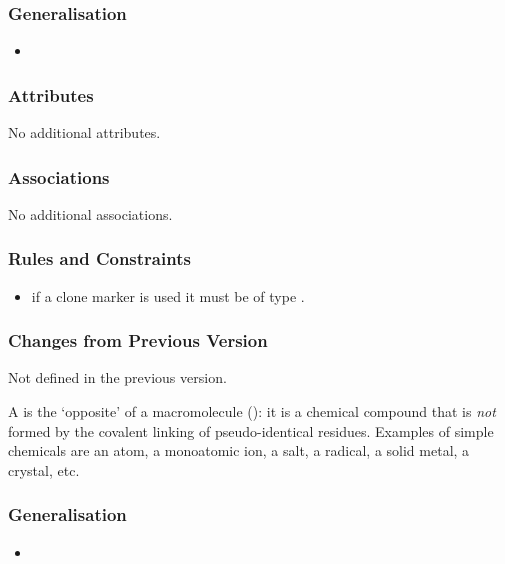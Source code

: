 \subsubsection{Generalisation}

\begin{itemize}
\item {}
\end{itemize}

\subsubsection{Attributes}

No additional attributes.

\subsubsection{Associations}

No additional associations.

\subsubsection{Rules and Constraints}

\begin{itemize}
\item if a clone marker is used it must be of type .
\end{itemize}

\subsubsection{Changes from Previous Version}

Not defined in the previous version.

\label{sec:techref:simpleChemical}

A  is the `opposite' of a macromolecule
(): it is a chemical compound that is \emph{not}
formed by the covalent linking of pseudo-identical residues.  Examples
of simple chemicals are an atom, a monoatomic ion, a salt, a radical,
a solid metal, a crystal, etc.

\subsubsection{Generalisation}

\begin{itemize}
\item {}
\end{itemize}


